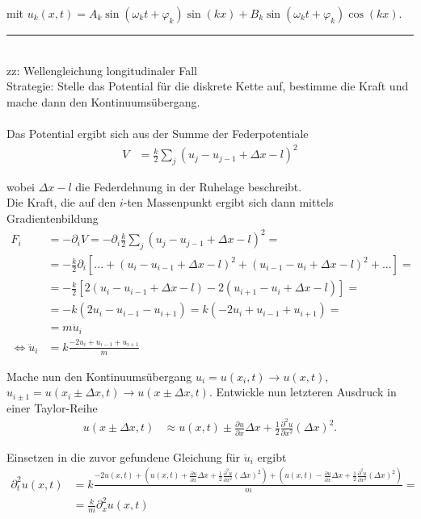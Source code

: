 \documentclass{article}
\newcommand{\lr}[1]{\left(#1\right)}
\newcommand{\lreck}[1]{\left[#1\right]}
\begin{document}
mit $u_k(x,t) = A_k \sin(\omega_k t + \varphi_k ) \sin(kx) + B_k \sin( \omega_k t + \varphi_k ) \cos(kx)$.


\newpage


{\color{violet}
\hrule
	\\
	zz: Wellengleichung longitudinaler Fall\\
	Strategie: Stelle das Potential für die diskrete Kette auf, bestimme die Kraft und mache dann den Kontinuumsübergang.\\
	\\
	{\color{red}Das Potential ergibt sich aus der Summe der Federpotentiale}
		\begin{align*}
			V &= \frac{k}{2} \sum_j (u_j - u_{j-1} + \Delta x - l)^2
		\end{align*}
	
	wobei $\Delta x - l$ die Federdehnung in der Ruhelage beschreibt.\\
	Die Kraft, die auf den $i$-ten Massenpunkt ergibt sich dann mittels Gradientenbildung
		\begin{align*}
			F_i &= -\partial_i V = -\partial_i \frac{k}{2} \sum_j (u_j - u_{j-1} + \Delta x - l)^2 = \\
			&= -\frac{k}{2} \partial_i \lreck{ ... + ( u_i - u_{i-1} + \Delta x - l)^2 + ( u_{i-1} - u_i + \Delta x - l)^2 + ... } = \\
			&= -\frac{k}{2} \lreck{ 2( u_i - u_{i-1} + \Delta x - l ) - 2( u_{i+1} - u_i + \Delta x - l ) } = \\
			&= -k (2u_i - u_{i-1} - u_{i+1}) = k (-2u_i + u_{i-1} + u_{i+1}) =\\
			&= m \ddot{u}_i \\
			\Leftrightarrow \ddot{u}_i &= k\frac{-2u_i + u_{i-1} + u_{i+1}}{m}
		\end{align*}

	Mache nun den Kontinuumsübergang $u_i = u(x_i,t) \to u(x,t)$, $u_{i\pm1} = u(x_i \pm \Delta x, t) \to u(x \pm \Delta x, t)$. Entwickle nun letzteren Ausdruck in einer Taylor-Reihe
		\begin{align*}
			u(x\pm\Delta x, t) &\approx u(x,t) \pm \frac{\partial u}{\partial x} \Delta x + \frac{1}{2} \frac{\partial^2 u}{\partial x^2} (\Delta x)^2.
		\end{align*}
	
	Einsetzen in die zuvor gefundene Gleichung für $\ddot{u}_i$ ergibt
		\begin{align*}
			\partial_t^2 u(x,t) &= k\frac{ -2u(x,t) + \lr{ u(x,t) + \frac{\partial u}{\partial x} \Delta x + \frac{1}{2} \frac{\partial^2 u}{\partial x^2} (\Delta x)^2 } + \lr{ u(x,t) - \frac{\partial u}{\partial x} \Delta x + \frac{1}{2} \frac{\partial^2 u}{\partial x^2} (\Delta x)^2 } }{m} = \\
			&= \frac{k}{m} \partial_x^2 u(x,t)
		\end{align*}

}
\end{document}
